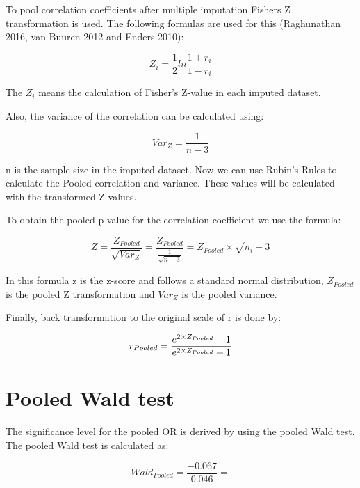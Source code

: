 \documentclass[]{book}
\theoremstyle{definition}
\theoremstyle{definition}
\theoremstyle{definition}
\theoremstyle{remark}
\begin{document}
To pool correlation coefficients after multiple imputation Fishers Z
transformation is used. The following formulas are used for this
(Raghunathan 2016, van Buuren 2012 and Enders 2010):

\begin{equation}
Z_i = \frac{1}{2}ln\frac{1+r_i}{1-r_i}
  \label{eq:cor}
\end{equation}

The \({Z_i}\) means the calculation of Fisher's Z-value in each imputed
dataset.

Also, the variance of the correlation can be calculated using:

\begin{equation}
Var_Z=\frac{1}{n-3}
  \label{eq:var-cor}
\end{equation}

n is the sample size in the imputed dataset. Now we can use Rubin's
Rules to calculate the Pooled correlation and variance. These values
will be calculated with the transformed Z values.

To obtain the pooled p-value for the correlation coefficient we use the
formula:

\begin{equation}
Z=\frac{Z_{Pooled}}{\sqrt{Var_Z}} = \frac{Z_{Pooled}}{\frac{1}{\sqrt{n-3}}}=Z_{Pooled}\times\sqrt{n_i-3}
  \label{eq:z-cor}
\end{equation}

In this formula z is the z-score and follows a standard normal
distribution, \(Z_{Pooled}\) is the pooled Z transformation and
\(Var_Z\) is the pooled variance.

Finally, back transformation to the original scale of r is done by:

\begin{equation}
r_{Pooled} = \frac{e^{2\times\\Z_{Pooled}}-1}{e^{2\times\\Z_{Pooled}}+1}
  \label{eq:exp-cor}
\end{equation}

\section{Pooled Wald test}\label{pooled-wald-test}

The significance level for the pooled OR is derived by using the pooled
Wald test. The pooled Wald test is calculated as:

\[Wald_{Pooled} =\frac{-0.067}{0.046}=\]
\end{document}
